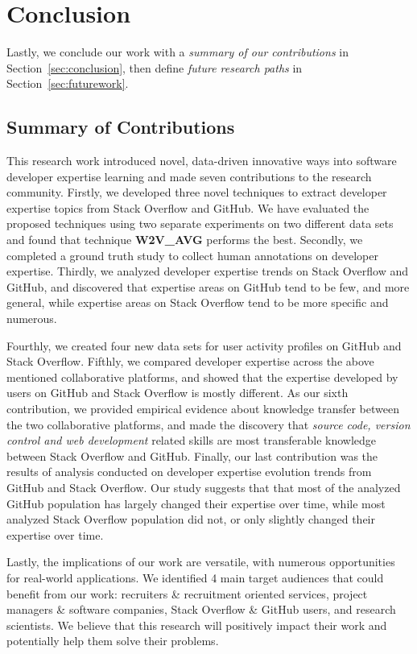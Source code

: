 \chapter{Conclusion\label{chap:conclusion}}

    Lastly, we conclude our work with a \emph{summary of our contributions} in Section~\ref{sec:conclusion}, then define \emph{future research paths} in Section~\ref{sec:futurework}.
        
    \section{Summary of Contributions\label{sec:conclusion}}
        
        This research work introduced novel, data-driven innovative ways into software developer expertise learning and made seven contributions to the research community. Firstly, we developed three novel techniques to extract developer expertise topics from Stack Overflow and GitHub. We have evaluated the proposed techniques using two separate experiments on two different data sets and found that technique \textbf{W2V\_AVG} performs the best. Secondly, we completed a ground truth study to collect human annotations on developer expertise. Thirdly, we analyzed developer expertise trends on Stack Overflow and GitHub, and discovered that expertise areas on GitHub tend to be few, and more general, while expertise areas on Stack Overflow tend to be more specific and numerous.
        
        Fourthly, we created four new data sets for user activity profiles on GitHub and Stack Overflow. Fifthly, we compared developer expertise across the above mentioned collaborative platforms, and showed that the expertise developed by users on GitHub and Stack Overflow is mostly different. As our sixth contribution, we provided empirical evidence about knowledge transfer between the two collaborative platforms, and made the discovery that \emph{source code, version control and web development} related skills are most transferable knowledge between Stack Overflow and GitHub. Finally, our last contribution was the results of analysis conducted on developer expertise evolution trends from GitHub and Stack Overflow. Our study suggests that that most of the analyzed GitHub population has largely changed their expertise over time, while most analyzed Stack Overflow population did not, or only slightly changed their expertise over time.
        
        Lastly, the implications of our work are versatile, with numerous opportunities for real-world applications. We identified 4 main target audiences that could benefit from our work: recruiters \& recruitment oriented services, project managers \& software companies, Stack Overflow \& GitHub users, and research scientists. We believe that this research will positively impact their work and potentially help them solve their problems. 
        
